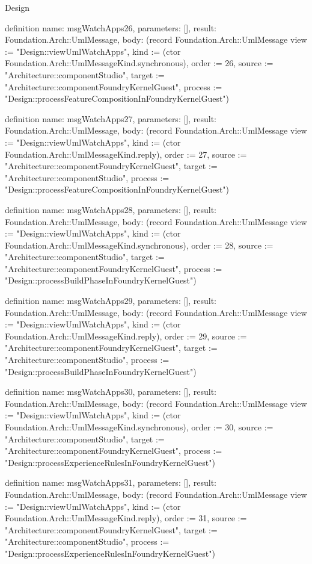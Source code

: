 \begin{lexlean}{Design}
\begin{semanticmodule}
definition{
  name: msgWatchApps26,
  parameters: [],
  result: Foundation.Arch::UmlMessage,
  body: (record Foundation.Arch::UmlMessage {view := "Design::viewUmlWatchApps", kind := (ctor Foundation.Arch::UmlMessageKind.synchronous), order := 26, source := "Architecture::componentStudio", target := "Architecture::componentFoundryKernelGuest", process := "Design::processFeatureCompositionInFoundryKernelGuest"})
}

definition{
  name: msgWatchApps27,
  parameters: [],
  result: Foundation.Arch::UmlMessage,
  body: (record Foundation.Arch::UmlMessage {view := "Design::viewUmlWatchApps", kind := (ctor Foundation.Arch::UmlMessageKind.reply), order := 27, source := "Architecture::componentFoundryKernelGuest", target := "Architecture::componentStudio", process := "Design::processFeatureCompositionInFoundryKernelGuest"})
}

definition{
  name: msgWatchApps28,
  parameters: [],
  result: Foundation.Arch::UmlMessage,
  body: (record Foundation.Arch::UmlMessage {view := "Design::viewUmlWatchApps", kind := (ctor Foundation.Arch::UmlMessageKind.synchronous), order := 28, source := "Architecture::componentStudio", target := "Architecture::componentFoundryKernelGuest", process := "Design::processBuildPhaseInFoundryKernelGuest"})
}

definition{
  name: msgWatchApps29,
  parameters: [],
  result: Foundation.Arch::UmlMessage,
  body: (record Foundation.Arch::UmlMessage {view := "Design::viewUmlWatchApps", kind := (ctor Foundation.Arch::UmlMessageKind.reply), order := 29, source := "Architecture::componentFoundryKernelGuest", target := "Architecture::componentStudio", process := "Design::processBuildPhaseInFoundryKernelGuest"})
}

definition{
  name: msgWatchApps30,
  parameters: [],
  result: Foundation.Arch::UmlMessage,
  body: (record Foundation.Arch::UmlMessage {view := "Design::viewUmlWatchApps", kind := (ctor Foundation.Arch::UmlMessageKind.synchronous), order := 30, source := "Architecture::componentStudio", target := "Architecture::componentFoundryKernelGuest", process := "Design::processExperienceRulesInFoundryKernelGuest"})
}

definition{
  name: msgWatchApps31,
  parameters: [],
  result: Foundation.Arch::UmlMessage,
  body: (record Foundation.Arch::UmlMessage {view := "Design::viewUmlWatchApps", kind := (ctor Foundation.Arch::UmlMessageKind.reply), order := 31, source := "Architecture::componentFoundryKernelGuest", target := "Architecture::componentStudio", process := "Design::processExperienceRulesInFoundryKernelGuest"})
}


\end{semanticmodule}
\end{lexlean}
